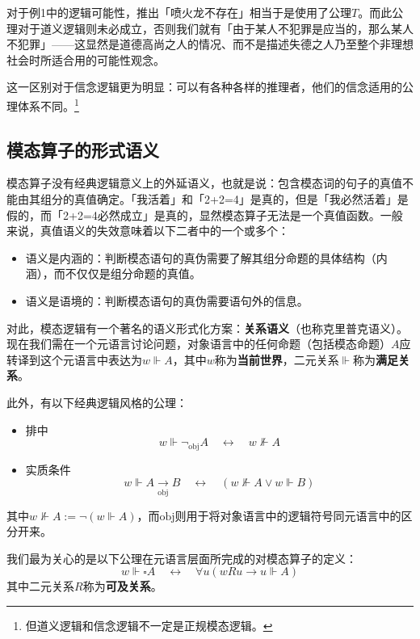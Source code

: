 \documentclass[fontset=ubuntu]{ctexart}
\begin{document}
			对于例1中的逻辑可能性，推出「喷火龙不存在」相当于是使用了公理\(T\)。而此公理对于道义逻辑则未必成立，否则我们就有「由于某人不犯罪是应当的，那么某人不犯罪」——这显然是道德高尚之人的情况、而不是描述失德之人乃至整个非理想社会时所适合用的可能性观念。

			这一区别对于信念逻辑更为明显：可以有各种各样的推理者，他们的信念适用的公理体系不同。\footnote{但道义逻辑和信念逻辑不一定是正规模态逻辑。}

		\subsection{模态算子的形式语义}

			模态算子没有经典逻辑意义上的外延语义，也就是说：包含模态词的句子的真值不能由其组分的真值确定。「我活着」和「2+2=4」是真的，但是「我必然活着」是假的，而「2+2=4必然成立」是真的，显然模态算子无法是一个真值函数。一般来说，真值语义的失效意味着以下二者中的一个或多个：
			
			\begin{itemize}
				\item 语义是内涵的：判断模态语句的真伪需要了解其组分命题的具体结构（内涵），而不仅仅是组分命题的真值。
				\item 语义是语境的：判断模态语句的真伪需要语句外的信息。
			\end{itemize}

			对此，模态逻辑有一个著名的语义形式化方案：\textbf{关系语义}（也称克里普克语义）。
			现在我们需在一个元语言讨论问题，对象语言中的任何命题（包括模态命题）\(A\)应转译到这个元语言中表达为\(w\Vdash A\)，其中\(w\)称为\textbf{当前世界}，二元关系\(\Vdash\)称为\textbf{满足关系}。
			
			此外，有以下经典逻辑风格的公理：
			\begin{itemize}
				\item 排中 \begin{equation}
					w\Vdash\lnot_\mathrm{obj} A\quad\longleftrightarrow\quad w \nVdash A
				\end{equation}
				\item 实质条件 \begin{equation}
					w\Vdash A\underset{\mathrm{obj}}{\longrightarrow} B\quad\longleftrightarrow\quad (w\nVdash A\lor w\Vdash B)
				\end{equation}
			\end{itemize}
			其中\(w\nVdash A:=\lnot(w\Vdash A)\)，而\(\mathrm{obj}\)则用于将对象语言中的逻辑符号同元语言中的区分开来。

			我们最为关心的是以下公理在元语言层面所完成的对模态算子的定义：
			\begin{equation}
				w\Vdash \square A \quad\longleftrightarrow\quad \forall u(wRu\to u\Vdash A)
			\end{equation}			
			其中二元关系\(R\)称为\textbf{可及关系}。
			
\end{document}
